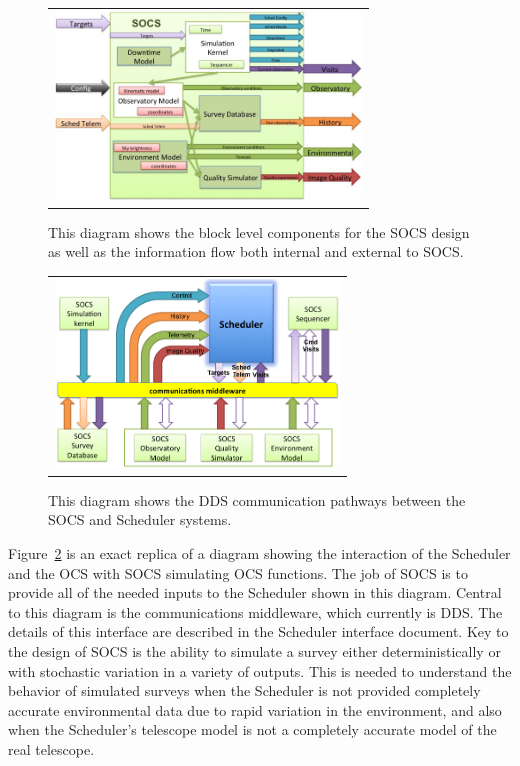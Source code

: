 \documentclass[]{spie}  %
\begin{document}
\begin{figure} [ht]
\begin{center}
\begin{tabular}{c}
\includegraphics[height=5cm]{CompArch.png}
\end{tabular}
\end{center}
\caption[example]
{ \label{fig:comparch} 
This diagram shows the block level components for the SOCS design as well as the information flow both internal and external to SOCS.}
\end{figure}

\begin{figure} [ht]
	\begin{center}
		\begin{tabular}{c}
			\includegraphics[height=5cm]{CommFlow.png}
		\end{tabular}
	\end{center}
	\caption[example]
	{ \label{fig:commflow} 
		This diagram shows the DDS communication pathways between the SOCS and Scheduler systems.}
\end{figure}

Figure~\ref*{fig:commflow} is an exact replica of a diagram showing the interaction of the Scheduler and the OCS with SOCS simulating OCS functions. The job of SOCS is to provide all of the needed inputs to the Scheduler shown in this diagram. Central to this diagram is the communications middleware, which currently is DDS. The details of this interface are described in the Scheduler interface document. Key to the design of SOCS is the ability to simulate a survey either deterministically or with stochastic variation in a variety of outputs. This is needed to understand the behavior of simulated surveys when the Scheduler is not provided completely accurate environmental data due to rapid variation in the environment, and also when the Scheduler’s telescope model is not a completely accurate model of the real telescope.
\end{document}
